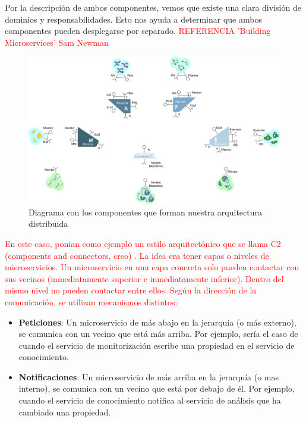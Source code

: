 Por la descripción de ambos componentes, vemos que existe una clara división de dominios y responsabilidades. Esto nos ayuda a determinar que ambos componentes pueden desplegarse por separado. \textcolor{red}{REFERENCIA 'Building Microservices' Sam Newman}

\begin{figure}[h]
  \centering
  \includegraphics[scale=0.3]{02_arquitectura/images/mape-k-microservices}
  \caption{Diagrama con los componentes que forman nuestra arquitectura distribuida}
  \label{fig:mape-k-microservices}
\end{figure}

\textcolor{red}{En este caso, ponian como ejemplo un estilo arquitectónico que se llama C2 (components and connectors, creo) . La idea era tener capas o niveles de microservicios. Un microservicio en una capa concreta solo pueden contactar con sus vecinos (inmediatamente superior e inmediatamente inferior). Dentro del mismo nivel no pueden contactar entre ellos. Según la dirección de la comunicación, se utilizan mecanismos distintos:}

\begin{itemize}
  \item \textbf{Peticiones}: Un microservicio de más abajo en la jerarquía (o más externo), se comunica con un vecino que está más arriba. Por ejemplo, sería el caso de cuando el servicio de monitorización escribe una propiedad en el servicio de conocimiento.

  \item \textbf{Notificaciones}: Un microservicio de más arriba en la jerarquía (o mas interno), se comunica con un vecino que está por debajo de él. Por ejemplo, cuando el servicio de conocimiento notifica al servicio de análisis que ha cambiado una propiedad.
\end{itemize}

